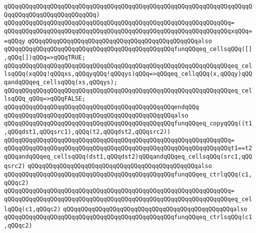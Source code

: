 \verb|qQQqqQQqqQQqqQQqqQQqqQQqqQQqqQQqqQQqqQQqqQQqqQQqqQQqqQQqqQQqqQQqqQQqqQQqqQQqqQQqqQQqqQQqqQQqqQQq)|\newline
\verb|qQQqqQQqqQQqqQQqqQQqqQQqqQQqqQQqqQQqqQQqqQQqqQQqqQQqqQQqqQQqqQQq=|\newline
\verb|qQQqqQQqqQQqqQQqqQQqqQQqqQQqqQQqqQQqqQQqqQQqqQQqqQQqqQQqqQQqqQQqxqQQq==qQQqy|\newline
\newline
\verb|qQQqqQQqqQQqqQQqqQQqqQQqqQQqqQQqqQQqqQQqqQQqqQQqalso|\newline
\verb|qQQqqQQqqQQqqQQqqQQqqQQqqQQqqQQqqQQqqQQqqQQqqQQqfunqQQqeq_cellsqQQq([],qQQq[])qQQq=>qQQqTRUE;|\newline
\verb|qQQqqQQqqQQqqQQqqQQqqQQqqQQqqQQqqQQqqQQqqQQqqQQqqQQqqQQqqQQqqQQqeq_cellsqQQq(xqQQq!qQQqxs,qQQqyqQQq!qQQqys)qQQq=>qQQqeq_cellqQQq(x,qQQqy)qQQqandqQQqeq_cellsqQQq(xs,qQQqys);|\newline
\verb|qQQqqQQqqQQqqQQqqQQqqQQqqQQqqQQqqQQqqQQqqQQqqQQqqQQqqQQqqQQqqQQqeq_cellsqQQq_qQQq=>qQQqFALSE;|\newline
\verb|qQQqqQQqqQQqqQQqqQQqqQQqqQQqqQQqqQQqqQQqqQQqqQQqendqQQq|\newline
\newline
\verb|qQQqqQQqqQQqqQQqqQQqqQQqqQQqqQQqqQQqqQQqqQQqqQQqalso|\newline
\verb|qQQqqQQqqQQqqQQqqQQqqQQqqQQqqQQqqQQqqQQqqQQqqQQqfunqQQqeq_copyqQQq((t1,qQQqdst1,qQQqsrc1),qQQq(t2,qQQqdst2,qQQqsrc2))|\newline
\verb|qQQqqQQqqQQqqQQqqQQqqQQqqQQqqQQqqQQqqQQqqQQqqQQqqQQqqQQqqQQqqQQq=|\newline
\verb|qQQqqQQqqQQqqQQqqQQqqQQqqQQqqQQqqQQqqQQqqQQqqQQqqQQqqQQqqQQqqQQqt1==t2qQQqandqQQqeq_cellsqQQq(dst1,qQQqdst2)qQQqandqQQqeq_cellsqQQq(src1,qQQqsrc2)|\newline
\newline
\verb|qQQqqQQqqQQqqQQqqQQqqQQqqQQqqQQqqQQqqQQqqQQqqQQqalso|\newline
\verb|qQQqqQQqqQQqqQQqqQQqqQQqqQQqqQQqqQQqqQQqqQQqqQQqfunqQQqeq_ctrlqQQq(c1,qQQqc2)|\newline
\verb|qQQqqQQqqQQqqQQqqQQqqQQqqQQqqQQqqQQqqQQqqQQqqQQqqQQqqQQqqQQqqQQq=|\newline
\verb|qQQqqQQqqQQqqQQqqQQqqQQqqQQqqQQqqQQqqQQqqQQqqQQqqQQqqQQqqQQqqQQqeq_cellqQQq(c1,qQQqc2)|\newline
\newline
\verb|qQQqqQQqqQQqqQQqqQQqqQQqqQQqqQQqqQQqqQQqqQQqqQQqalso|\newline
\verb|qQQqqQQqqQQqqQQqqQQqqQQqqQQqqQQqqQQqqQQqqQQqqQQqfunqQQqeq_ctrlsqQQq(c1,qQQqc2)|\newline
